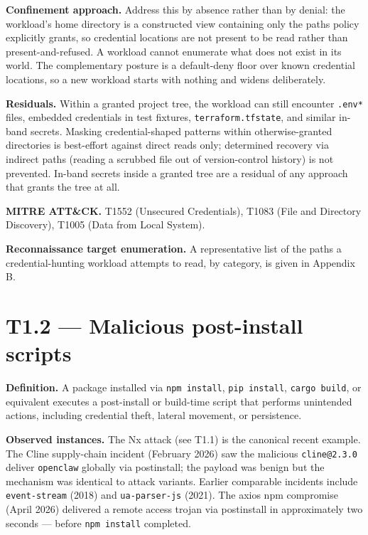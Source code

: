\textbf{Confinement approach.} Address this by absence rather than by
denial: the workload's home directory is a constructed view containing
only the paths policy explicitly grants, so credential locations are not
present to be read rather than present-and-refused. A workload cannot
enumerate what does not exist in its world. The complementary posture is
a default-deny floor over known credential locations, so a new workload
starts with nothing and widens deliberately.

\textbf{Residuals.} Within a granted project tree, the workload can
still encounter \texttt{.env*} files, embedded credentials in test
fixtures, \texttt{terraform.tfstate}, and similar in-band secrets.
Masking credential-shaped patterns within otherwise-granted directories
is best-effort against direct reads only; determined recovery via
indirect paths (reading a scrubbed file out of version-control history)
is not prevented. In-band secrets inside a granted tree are a residual
of any approach that grants the tree at all.

\textbf{MITRE ATT\&CK.} T1552 (Unsecured Credentials), T1083 (File and
Directory Discovery), T1005 (Data from Local System).

\textbf{Reconnaissance target enumeration.} A representative list of the
paths a credential-hunting workload attempts to read, by category, is
given in Appendix B.

\hypertarget{t1.2-malicious-post-install-scripts}{%
\section{T1.2 --- Malicious post-install
scripts}\label{t1.2-malicious-post-install-scripts}}

\textbf{Definition.} A package installed via \texttt{npm\ install},
\texttt{pip\ install}, \texttt{cargo\ build}, or equivalent executes a
post-install or build-time script that performs unintended actions,
including credential theft, lateral movement, or persistence.

\textbf{Observed instances.} The Nx attack (see T1.1) is the canonical
recent example. The Cline supply-chain incident (February 2026) saw the
malicious \texttt{cline@2.3.0} deliver \texttt{openclaw} globally via
postinstall; the payload was benign but the mechanism was identical to
attack variants. Earlier comparable incidents include
\texttt{event-stream} (2018) and \texttt{ua-parser-js} (2021). The axios
npm compromise (April 2026) delivered a remote access trojan via
postinstall in approximately two seconds --- before
\texttt{npm\ install} completed.

